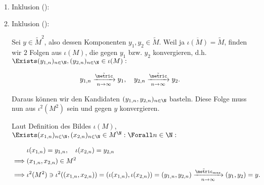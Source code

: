 \begin{solution}
\begin{enumerate}[label = \arabic*.]
\begin{enumerate}[label = 2.\arabic*.]
        \begin{enumerate}[label = \arabic*.]

            \item Inklusion (\Quote{$\subseteq$}):

            \item Inklusion (\Quote{$\supseteq$}):
            
            Sei $y \in \tilde M^2$, also dessen Komponenten $y_1, y_2 \in \tilde M$.
            Weil ja $\overline{\iota(M)} = \tilde M$, finden wir $2$ Folgen aus $\iota(M)$, die gegen $y_1$ bzw. $y_2$ konvergieren, d.h. $\Exists (y_{1, n})_{n \in \N}, (y_{2, n})_{n \in \N} \in \iota(M):$

            \begin{align*}
                y_{1, n} \xrightarrow[n \to \infty]{\tilde \metric} y_1,
                \quad
                y_{2, n} \xrightarrow[n \to \infty]{\tilde \metric} y_2.
            \end{align*}

            Daraus können wir den Kandidaten $(y_{1, n}, y_{2, n})_{n \in \N}$ basteln.
            Diese Folge muss nun aus $\iota^2(M^2)$ sein und gegen $y$ konvergieren.
            
            Laut Definition des Bildes $\iota(M)$, $\Exists (x_{1, n})_{n \in \N}, (x_{2, n})_{n \in \N} \in M^\N: \Forall n \in \N:$

            \begin{align*}
                & \iota(x_{1, n}) = y_{1, n},
                \quad
                \iota(x_{2, n}) = y_{2, n} \\
                \implies
                & (x_{1, n}, x_{2, n}) \in M^2 \\
                \implies
                & \iota^2(M^2)
                \ni
                \iota^2((x_{1, n}, x_{2, n}))
                =
                (
                    \iota(x_{1, n}),
                    \iota(x_{2, n})
                )
                =
                (y_{1, n}, y_{2, n})
                \xrightarrow[n \to \infty]{\tilde \metric_{\max}}
                (y_1, y_2)
                =
                y.
            \end{align*}

        \end{enumerate}

    \end{enumerate}

\end{enumerate}

\end{solution}


